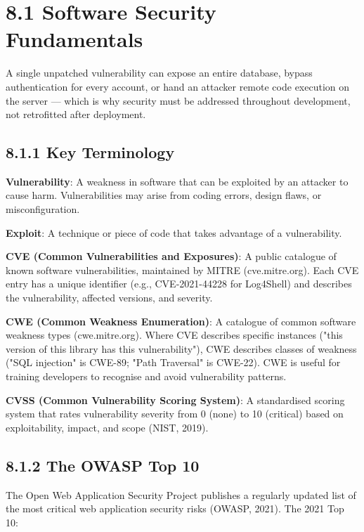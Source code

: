 \documentclass[11pt,a4paper]{book}
\begin{document}
\medskip

\section{8.1 Software Security Fundamentals}

A single unpatched vulnerability can expose an entire database, bypass authentication for every account, or hand an attacker remote code execution on the server --- which is why security must be addressed throughout development, not retrofitted after deployment.

\subsection{8.1.1 Key Terminology}

\textbf{Vulnerability}: A weakness in software that can be exploited by an attacker to cause harm. Vulnerabilities may arise from coding errors, design flaws, or misconfiguration.

\textbf{Exploit}: A technique or piece of code that takes advantage of a vulnerability.

\textbf{CVE (Common Vulnerabilities and Exposures)}: A public catalogue of known software vulnerabilities, maintained by MITRE (cve.mitre.org). Each CVE entry has a unique identifier (e.g., CVE-2021-44228 for Log4Shell) and describes the vulnerability, affected versions, and severity.

\textbf{CWE (Common Weakness Enumeration)}: A catalogue of common software weakness types (cwe.mitre.org). Where CVE describes specific instances ("this version of this library has this vulnerability"), CWE describes classes of weakness ("SQL injection" is CWE-89; "Path Traversal" is CWE-22). CWE is useful for training developers to recognise and avoid vulnerability patterns.

\textbf{CVSS (Common Vulnerability Scoring System)}: A standardised scoring system that rates vulnerability severity from 0 (none) to 10 (critical) based on exploitability, impact, and scope (NIST, 2019).

\subsection{8.1.2 The OWASP Top 10}

The Open Web Application Security Project publishes a regularly updated list of the most critical web application security risks (OWASP, 2021). The 2021 Top 10:
\end{document}

